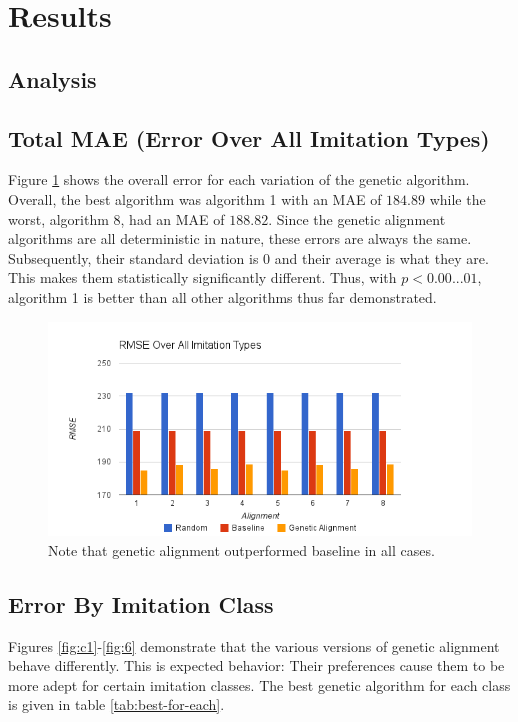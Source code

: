 \section {Results}
\label{results}

\subsection {Analysis} 

\subsection{Total MAE (Error Over All Imitation Types)}
Figure \ref{fig:overall} shows the overall error for each variation of the genetic algorithm. Overall, the best algorithm was algorithm 1 with an MAE of $184.89$ while the worst, algorithm 8, had an MAE of $188.82$. Since the genetic alignment algorithms are all deterministic in nature, these errors are always the same. Subsequently, their standard deviation is 0 and their average is what they are. This makes them statistically significantly different. Thus, with $p < 0.00...01$, algorithm 1 is better than all other algorithms thus far demonstrated.

\begin{figure}[center]
	\centering
	\includegraphics[width=16cm]{images/chart9.png}
	\caption{Note that genetic alignment outperformed baseline in all cases.}
	\label{fig:overall}
\end{figure}

\subsection{Error By Imitation Class}
Figures \ref{fig:c1}-\ref{fig:6} demonstrate that the various versions of genetic alignment behave differently. This is expected behavior: Their preferences cause them to be more adept for certain imitation classes. The best genetic algorithm for each class is given in table \ref{tab:best-for-each}.


